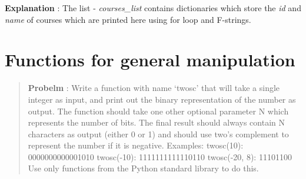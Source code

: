 \documentclass[11pt]{article}
\begin{document}
    \textbf{Explanation} : The list - \emph{courses\_list} contains
dictionaries which store the \emph{id} and \emph{name} of courses which
are printed here using for loop and F-strings.

    \hypertarget{functions-for-general-manipulation}{%
\section{Functions for general
manipulation}\label{functions-for-general-manipulation}}

    \begin{quote}
\textbf{Probelm} : Write a function with name `twosc' that will take a
single integer as input, and print out the binary representation of the
number as output. The function should take one other optional parameter
N which represents the number of bits. The final result should always
contain N characters as output (either 0 or 1) and should use two's
complement to represent the number if it is negative. Examples:
twosc(10): 0000000000001010 twosc(-10): 1111111111110110 twosc(-20, 8):
11101100 Use only functions from the Python standard library to do this.
\end{quote}
\end{document}
